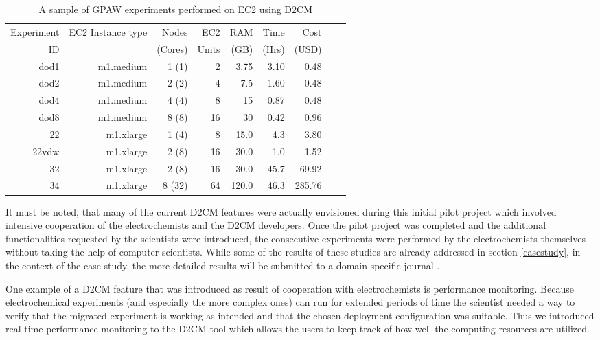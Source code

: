 \documentclass[a4paper,10pt]{article}
\begin{document}
\begin{table}
\begin{center}
\begin{tabular}{ r r r r r r r r r  }
\hline
Experiment	& EC2 Instance type 	& Nodes   	& EC2		& RAM 		& Time  	& Cost  \\
ID		&		& (Cores) 	& Units		& (GB) 		& (Hrs) 	& (USD) \\\hline
dod1		& m1.medium	& 1 (1)		& 2		& 3.75		& 3.10		& 0.48\\
dod2		& m1.medium	& 2 (2)		& 4		& 7.5		& 1.60		& 0.48\\
dod4		& m1.medium	& 4 (4)		& 8		& 15		& 0.87		& 0.48\\
dod8		& m1.medium	& 8 (8)		& 16		& 30		& 0.42		& 0.96\\
22 		& m1.xlarge	& 1 (4)		& 8		& 15.0		& 4.3		& 3.80 	\\
22vdw 		& m1.xlarge	& 2 (8)		& 16		& 30.0		& 1.0		& 1.52 	\\
32 		& m1.xlarge	& 2 (8)		& 16		& 30.0		& 45.7		& 69.92 \\
34 		& m1.xlarge	& 8 (32)	& 64		& 120.0		& 46.3		& 285.76\\
\end{tabular}
\end{center}
  \caption{A sample of GPAW experiments performed on EC2 using D2CM}
  \label{tab:GPAW_EC2}
\end{table}


It must be noted, that many of the current D2CM features were actually envisioned during this initial pilot project which involved intensive cooperation of the electrochemists and the D2CM developers. Once the pilot project was completed and the additional functionalities requested by the scientists were introduced, the consecutive experiments were performed by the electrochemists themselves without taking the help of computer scientists. While some of the results of these studies are already addressed in section \ref{casestudy}, in the context of the case study, the more detailed results will be submitted to a domain specific journal \cite{ivanistsev2012}.

One example of a D2CM feature that was introduced as result of cooperation with electrochemists is performance monitoring. Because electrochemical experiments (and especially the more complex ones) can run for extended periods of time the scientist needed a way to verify that the migrated experiment is working as intended and that the chosen deployment configuration was suitable. Thus we introduced real-time performance monitoring to the D2CM tool which allows the users to keep track of how well the computing resources are utilized. 
\end{document}
